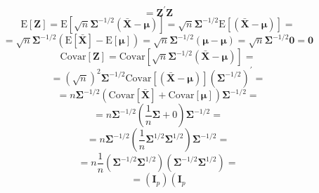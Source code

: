\begin{enumerate}[label= (\alph*)]
\[        =
        \textbf{Z}^{\prime}
        \textbf{Z}
    \]
    \[
        \text{E}
        \left[
            \textbf{Z}
        \right]
        =
        \text{E}
        \left[
            \sqrt{n}
            \bm{\Sigma}^{-1/2}
            \left(\bar{\textbf{X}} - \bm{\mu}\right)
        \right]
        =
        \sqrt{n}
        \bm{\Sigma}^{-1/2}
        \text{E}
        \left[
            \left(\bar{\textbf{X}} - \bm{\mu}\right)
        \right]
        =
    \]
    \[
        =
        \sqrt{n}
        \bm{\Sigma}^{-1/2}
        \left(
            \text{E}
            \left[
                \bar{\textbf{X}}
            \right]
            -
            \text{E}
            \left[
                \bm{\mu}
            \right]
        \right)
        =
        \sqrt{n}
        \bm{\Sigma}^{-1/2}
        \left(
            \bm{\mu}
            -
            \bm{\mu}
        \right)
        =
        \sqrt{n}
        \bm{\Sigma}^{-1/2}
        \textbf{0}
        =
        \textbf{0}
    \]
    \[
        \text{Covar}
        \left[
            \textbf{Z}
        \right]
        =
        \text{Covar}
        \left[
            \sqrt{n}
            \bm{\Sigma}^{-1/2}
            \left(\bar{\textbf{X}} - \bm{\mu}\right)
        \right]
        =
    \]
    \[=
        {\left(\sqrt{n}\right)}^{2}
        \bm{\Sigma}^{-1/2}
        \text{Covar}
        \left[
            \left(\bar{\textbf{X}} - \bm{\mu}\right)
        \right]
        {\left(\bm{\Sigma}^{-1/2}\right)}^{\prime}
        =
    \]
    \[
        =
        n
        \bm{\Sigma}^{-1/2}
        \left(
            \text{Covar}
            \left[
                \bar{\textbf{X}}
            \right]
            +
            \text{Covar}
            \left[
                \bm{\mu}
            \right]
        \right)
        \bm{\Sigma}^{-1/2}
        =
    \]
    \[
        =
        n
        \bm{\Sigma}^{-1/2}
        \left(
            \frac{1}{n}\bm{\Sigma}
            +
            0
        \right)
        \bm{\Sigma}^{-1/2}
        =
    \]
    \[
        =
        n
        \bm{\Sigma}^{-1/2}
        \left(
            \frac{1}{n}
            \bm{\Sigma}^{1/2}
            \bm{\Sigma}^{1/2}
        \right)
        \bm{\Sigma}^{-1/2}
        =
    \]
    \[
        =
        n
        \frac{1}{n}
        \left(
            \bm{\Sigma}^{-1/2}
            \bm{\Sigma}^{1/2}
        \right)
        \left(
            \bm{\Sigma}^{-1/2}
            \bm{\Sigma}^{1/2}
        \right)
        =
    \]
    \[
        =
        \left(
            \textbf{I}_{p}
        \right)
        \left(
            \textbf{I}_{p}
\]
\end{enumerate}
